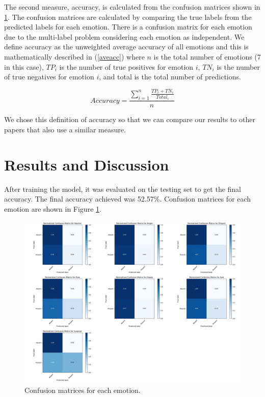 \documentclass[conference]{IEEEtran}
\begin{document}
The second measure, accuracy, is calculated from the confusion matrices shown in \ref{confusionMatrix}. The confusion matrices are calculated by comparing the true labels from the predicted labels for each emotion. There is a confusion matrix for each emotion due to the multi-label problem considering each emotion as independent. We define accuracy as the unweighted average accuracy of all emotions and this is mathematically described in (\ref{aveacc}) where $n$ is the total number of emotions (7 in this case), $TP_{i}$ is the number of true positives for emotion $i$, $TN_{i}$ is the number of true negatives for emotion $i$, and total is the total number of predictions.

\begin{equation}
\label{aveacc}
Accuracy = \frac{\sum_{i=1}^{n}\frac{TP_{i} + TN_{i}}{Total_{i}}}{n}
\end{equation}

We chose this definition of accuracy so that we can compare our results to other papers that also use a similar measure.

\section{Results and Discussion}

After training the model, it was evaluated on the testing set to get the final accuracy. The final accuracy achieved was 52.57\%. Confusion matrices for each emotion are shown in Figure \ref{confusionMatrix}.

\begin{figure}[h!]
	\centering
	\hspace{6mm}
	\includegraphics[width=\textwidth]{confusion_matrix.png}
	\caption{Confusion matrices for each emotion.}
	\label{confusionMatrix}
\end{figure}
\end{document}

